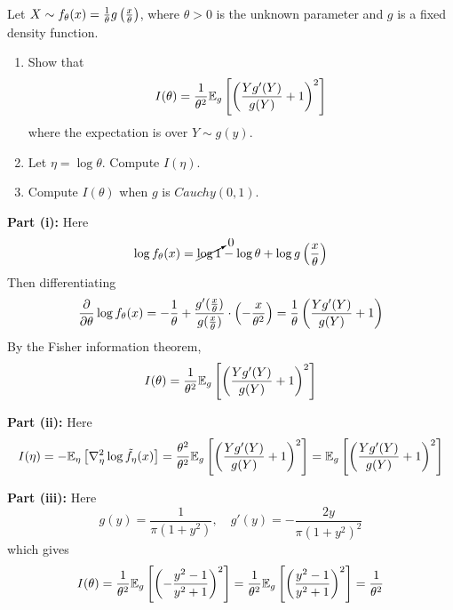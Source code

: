 \documentclass{article}
\begin{document}
\begin{homeworkProblem}
  Let $X\sim f_\theta(x) = \frac{1}{\theta}g\left( \frac{x}{\theta} \right)$, where $\theta > 0$ is the unknown parameter
  and $g$ is a fixed density function.
  \begin{enumerate}[label=\roman*), topsep=5pt, itemsep=5pt]
    \item Show that
          \[
            I(\theta) = \frac{1}{\theta^2} \mathbb{E}_g \left[ \left( \frac{Yg'(Y)}{g(Y)} + 1 \right)^2 \right]
          \]
          where the expectation is over $Y\sim g(y)$.
    \item Let $\eta=\log\theta$. Compute $I(\eta)$.
    \item Compute $I(\theta)$ when $g$ is $Cauchy(0,1)$. \newline
  \end{enumerate}

  \solution

  \textbf{Part (i):} Here
  \[
    \log f_\theta(x) = \cancelto{0}{\log 1} - \log \theta + \log g\left( \frac{x}{\theta} \right)
  \]
  Then differentiating
  \[
    \frac{\partial}{\partial \theta} \log f_\theta(x) = -\frac{1}{\theta} + \frac{g'(\frac{x}{\theta})}{g(\frac{x}{\theta})} \cdot \left( -\frac{x}{\theta^2} \right) = \frac{1}{\theta}\left( \frac{Yg'(Y)}{g(Y)} + 1 \right)
  \]
  By the Fisher information theorem,
  \[
    I(\theta) = \frac{1}{\theta^2} \mathbb{E}_g \left[ \left( \frac{Yg'(Y)}{g(Y)} + 1 \right)^2 \right]
  \]

  \textbf{Part (ii):} Here
  \[
    I(\eta) = -\mathbb{E}_\eta\left[\nabla_\eta^2 \log \tilde{f}_\eta(x) \right] = \frac{\theta^2}{\theta^2} \mathbb{E}_g \left[ \left( \frac{Yg'(Y)}{g(Y)} + 1 \right)^2 \right] = \mathbb{E}_g \left[ \left( \frac{Yg'(Y)}{g(Y)} + 1 \right)^2 \right]
  \]

  \textbf{Part (iii):} Here
  \[
    g(y) = \frac{1}{\pi(1+y^2)}, \quad g'(y) = -\frac{2y}{\pi(1+y^2)^2}
  \]
  which gives
  \[
    I(\theta) = \frac{1}{\theta^2} \mathbb{E}_g \left[ \left( -\frac{y^2-1}{y^2+1} \right)^2 \right] = \frac{1}{\theta^2} \mathbb{E}_g \left[ \left( \frac{y^2-1}{y^2+1} \right)^2 \right] = \frac{1}{\theta^2}
  \]


\end{homeworkProblem}

\pagebreak

\pagebreak
\end{document}
